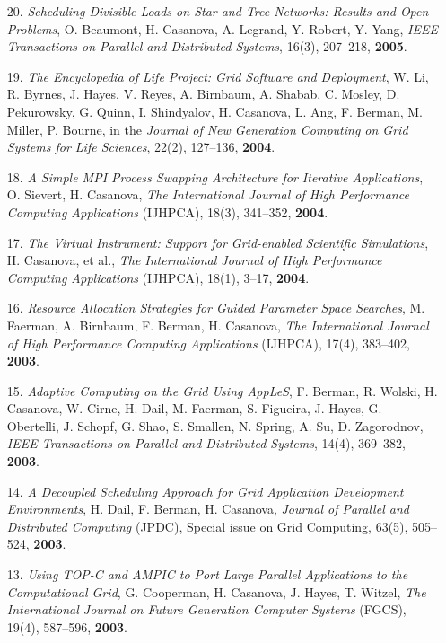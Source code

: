\begin{enumerate}
\item [20.]
{\it Scheduling Divisible Loads on Star and Tree Networks: Results
and Open Problems}, O. Beaumont, H. Casanova, A. Legrand, Y. Robert,
Y. Yang, \emph{IEEE Transactions on Parallel and Distributed
Systems}, 16(3), 207--218, {\bf 2005}.

\item [19.]
{\it The Encyclopedia of Life Project: Grid Software and Deployment},
W. Li, R. Byrnes, J. Hayes, V. Reyes, A. Birnbaum, A. Shabab, C. Mosley,
D. Pekurowsky, G. Quinn, I. Shindyalov, H. Casanova, L. Ang, F. Berman,
M. Miller, P. Bourne, in the \emph{Journal of New Generation Computing
on Grid Systems for Life Sciences}, 22(2), 127--136, {\bf 2004}.

\item [18.]
{\it A Simple MPI Process Swapping Architecture for Iterative
Applications}, O. Sievert, H. Casanova, \emph{The International Journal
of High Performance Computing Applications} (IJHPCA), 18(3),  341--352,
{\bf 2004}.

\item [17.]
{\it The Virtual Instrument: Support for Grid-enabled Scientific
Simulations}, H. Casanova, et al., \emph{The International Journal of High
Performance Computing Applications} (IJHPCA), 18(1), 3--17, {\bf 2004}.

\item [16.] 
{\it Resource Allocation Strategies for Guided Parameter Space Searches},
M. Faerman, A. Birnbaum, F. Berman, H. Casanova, \emph{The International
Journal of High Performance Computing Applications} (IJHPCA), 
17(4),  383--402, {\bf 2003}.

\item [15.]
{\it Adaptive Computing on the Grid Using AppLeS}, F. Berman, R. Wolski,
H. Casanova, W. Cirne, H. Dail, M. Faerman, S. Figueira, J. Hayes,
G. Obertelli, J. Schopf, G. Shao, S. Smallen, N. Spring, A. Su,
D. Zagorodnov, \emph{IEEE Transactions on Parallel and Distributed
Systems}, 14(4), 369--382, {\bf 2003}.

\item [14.]
{\it A Decoupled Scheduling Approach for Grid Application Development
Environments}, H. Dail, F. Berman, H. Casanova, \emph{Journal of Parallel
and Distributed Computing} (JPDC), Special issue on Grid Computing,
63(5), 505--524, {\bf 2003}.

\item[13.]
{\it Using TOP-C and AMPIC to Port Large Parallel Applications to the
Computational Grid}, G. Cooperman, H. Casanova, J. Hayes, T. Witzel,
\emph{The International Journal on Future Generation Computer Systems}
(FGCS), 19(4), 587--596, {\bf 2003}.  


\end{enumerate}
